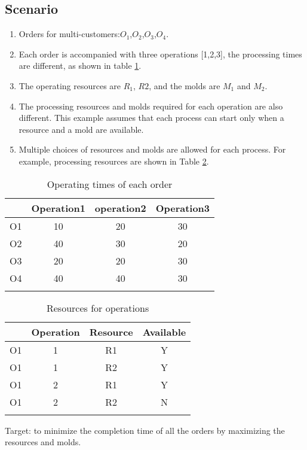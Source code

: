 \documentclass{article}
\begin{document}
	\subsection{Scenario}
	\begin{enumerate}[(1)]
		\item Orders for multi-customers:$ O_1 $,$ O_2 $,$ O_3 $,$ O_4 $.\\
		\item Each order is accompanied with three operations [1,2,3], the processing times are different, as shown in table \ref{order_operations}.\\
		\item The operating resources are $ R_1 $, $ R2 $, and the molds are $ M_1 $ and $ M_2 $.\\
		\item The processing resources and molds required for each operation are also different. This example assumes that each process can start only when a resource and a mold are available.\\
		\item Multiple choices of resources and molds are allowed for each process. For example, processing resources are shown in Table \ref{resources_ope}.\\
	\end{enumerate}
	\begin{table}
		\centering
		\caption{Operating times of each order}
		\begin{tabular}{*{4}{c}}
			\toprule
			& Operation1 & operation2 & Operation3\\
			\midrule
			O1&10&20&30\\
			O2&40&30&20\\
			O3&20&20&30\\
			O4&40&40&30\\
			\bottomrule
			\label{order_operations}
		\end{tabular}
	\end{table}
	\begin{table} 
		\centering
		\caption{Resources for operations}
		\begin{tabular} {*{4}{c}}
			\toprule
			& Operation & Resource & Available\\
			\midrule
			O1&1&R1&Y\\
			O1&1&R2&Y\\
			O1&2&R1&Y\\
			O1&2&R2&N\\
			\bottomrule
			\label{resources_ope}
		\end{tabular}
	\end{table}
	Target: to minimize the completion time of all the orders by maximizing the resources and molds.
\end{document}

